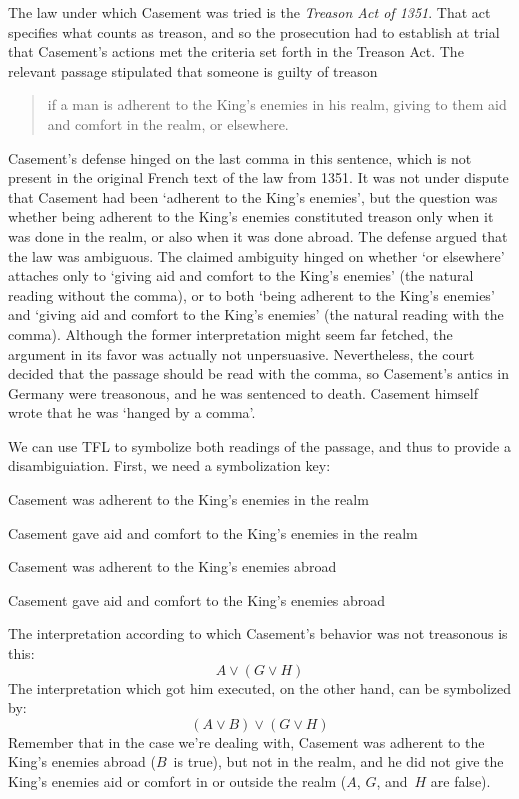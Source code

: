 The law under which Casement was tried is the \textit{Treason Act of 1351}. That act specifies what counts as treason, and so the prosecution had to establish at trial that Casement's actions met the criteria set forth in the Treason Act. The relevant passage stipulated that someone is guilty of treason
\begin{quote}
	if a man is adherent to the King's enemies in his
realm, giving to them aid and comfort in the realm, or elsewhere.
\end{quote}
Casement's defense hinged on the last comma in this sentence, which is not present in the original French text of the law from 1351.  It was not under dispute that Casement had been `adherent to the King's enemies', but the question was whether being adherent to the King's enemies constituted treason only when it was done in the realm, or also when it was done abroad. The defense argued that the law was ambiguous. The claimed ambiguity hinged on whether `or elsewhere' attaches only to `giving aid and comfort to the King's enemies' (the natural reading without the comma), or to both `being adherent to the King's enemies' and `giving aid and comfort to the King's enemies' (the natural reading with the comma).  Although the former interpretation might seem far fetched, the argument in its favor was actually not unpersuasive. Nevertheless, the court decided that the passage should be read with the comma, so Casement's antics in Germany were treasonous, and he was sentenced to death. Casement himself wrote that he was `hanged by a comma'.

We can use TFL to symbolize both readings of the passage, and thus to provide a disambiguiation. First, we need a symbolization key:
\begin{ekey}
	\item[A] Casement was adherent to the King's enemies in the realm
	\item[G] Casement gave aid and comfort to the King's enemies in the realm
	\item[B] Casement was adherent to the King's enemies abroad
	\item[H] Casement gave aid and comfort to the King's enemies abroad
\end{ekey}
The interpretation according to which Casement's behavior was not treasonous is this:
\[A \lor (G \lor H)\]
The interpretation which got him executed, on the other hand, can be symbolized by:
\[(A \lor B) \lor (G \lor H)\]
Remember that in the case we're dealing with, Casement was adherent to the King's enemies abroad ($B$~is true), but not in the realm, and he did not give the King's enemies aid or comfort in or outside the realm ($A$, $G$, and~$H$ are false).

